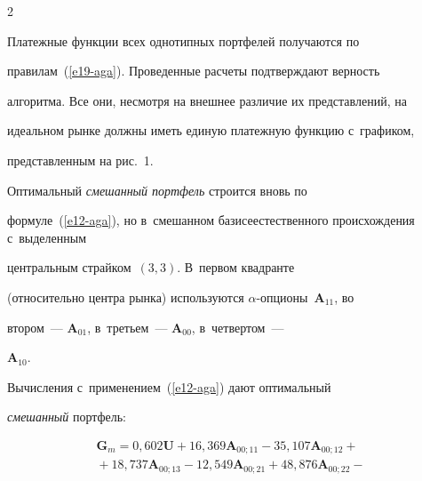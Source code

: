 \begin{multicols}{2}
\vspace*{-2pt}








  


  Платежные функции всех однотипных портфелей получаются по 


правилам~(\ref{e19-aga}). Проведенные расчеты под\-тверж\-да\-ют вер\-ность 


алгоритма. Все они, несмотря на внешнее различие их пред\-став\-ле\-ний, на 


идеальном рынке должны иметь единую платежную функцию с~графиком, 


пред\-став\-лен\-ным на рис.~1. 


  


  Оптимальный \textit{смешанный портфель} строится вновь по 


формуле~(\ref{e12-aga}), но в~смешанном базисе\linebreak естественного происхождения с~выделенным 


цент\-раль\-ным страйком~$(3, 3)$. В~первом квад\-ран\-те\linebreak 


(относительно цент\-ра рынка) используются $\alpha$-оп\-ци\-оны~$\bm{A}_{11}$, во 


втором~--- $\bm{A}_{01}$, в~треть\-ем~--- $\bm{A}_{00}$, в~\mbox{чет\-вер\-том}~--- 


$\bm{A}_{10}$. 


  


  Вычисления с~применением~(\ref{e12-aga}) дают оптимальный 


\textit{смешанный} портфель:





\vspace*{-2pt}


 





\noindent


\begin{multline*}


  \bm{G}_m=0{,}602\bm{U} + 16{,}369\bm{A}_{00;11} - 35{,}107\bm{A}_{00;12} + {}\\


  {}+


18{,}737\bm{A}_{00;13} - 12{,}549\bm{A}_{00;21} + 48{,}876\bm{A}_{00;22} - {}\\



\end{multline*}
\end{multicols}

